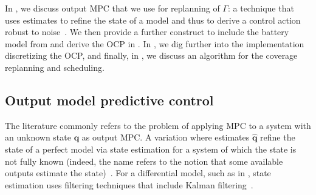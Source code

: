 In , we discuss output MPC that we use for replanning of $\Gamma$: a technique that uses estimates to refine the state of a model and thus to derive a control action robust to noise~\citep{rawlings2017model}. We then provide a further construct to include the battery model from  and derive the OCP in . In , we dig further into the implementation discretizing the OCP, and finally, in , we discuss an algorithm for the coverage replanning and scheduling. 

\subsection{Output model predictive control}
\label{sec:output-mpc}

The literature commonly refers to the problem of applying MPC to a system with an unknown state $\mathbf{q}$ as output MPC. A variation where estimates $\hat{\mathbf{q}}$ refine the state of a perfect model via state estimation for a system of which the state is not fully known (indeed, the name refers to the notion that some available outputs estimate the state)~\citep{rawlings2017model}. For a differential model, such as  in , state estimation uses filtering techniques that include Kalman filtering~\citep{simon2006optimal,kalman1960new}.

